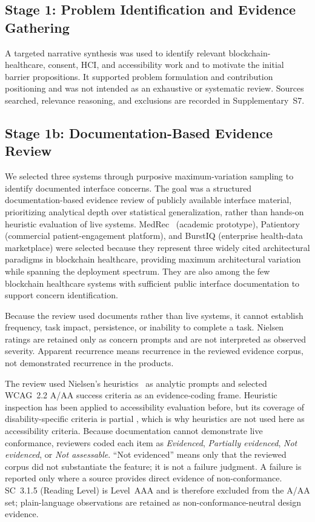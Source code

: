 \documentclass[journal]{IEEEtran}
\begin{document}
\subsection{Stage 1: Problem Identification and Evidence Gathering}
A targeted narrative synthesis was used to identify relevant blockchain-healthcare, consent, HCI, and accessibility work and to motivate the initial barrier propositions. It supported problem formulation and contribution positioning and was not intended as an exhaustive or systematic review. Sources searched, relevance reasoning, and exclusions are recorded in Supplementary~S7.

\subsection{Stage 1b: Documentation-Based Evidence Review}
\label{subsec:heuristic-eval}
We selected three systems through purposive maximum-variation sampling to identify documented interface concerns. The goal was a structured documentation-based evidence review of publicly available interface material, prioritizing analytical depth over statistical generalization, rather than hands-on heuristic evaluation of live systems. MedRec~\cite{medrec} (academic prototype), Patientory (commercial patient-engagement platform), and BurstIQ (enterprise health-data marketplace) were selected because they represent three widely cited architectural paradigms in blockchain healthcare, providing maximum architectural variation while spanning the deployment spectrum. They are also among the few blockchain healthcare systems with sufficient public interface documentation to support concern identification.

Because the review used documents rather than live systems, it cannot establish frequency, task impact, persistence, or inability to complete a task. Nielsen ratings are retained only as concern prompts and are not interpreted as observed severity. Apparent recurrence means recurrence in the reviewed evidence corpus, not demonstrated recurrence in the products.

The review used Nielsen's heuristics~\cite{nielsen1994usability} as analytic prompts and selected WCAG~2.2 A/AA success criteria as an evidence-coding frame. Heuristic inspection has been applied to accessibility evaluation before, but its coverage of disability-specific criteria is partial \cite{paz2019heuristic}, which is why heuristics are not used here as accessibility criteria. Because documentation cannot demonstrate live conformance, reviewers coded each item as \emph{Evidenced}, \emph{Partially evidenced}, \emph{Not evidenced}, or \emph{Not assessable}. ``Not evidenced'' means only that the reviewed corpus did not substantiate the feature; it is not a failure judgment. A failure is reported only where a source provides direct evidence of non-conformance. SC~3.1.5 (Reading Level) is Level~AAA and is therefore excluded from the A/AA set; plain-language observations are retained as non-conformance-neutral design evidence.
\end{document}
